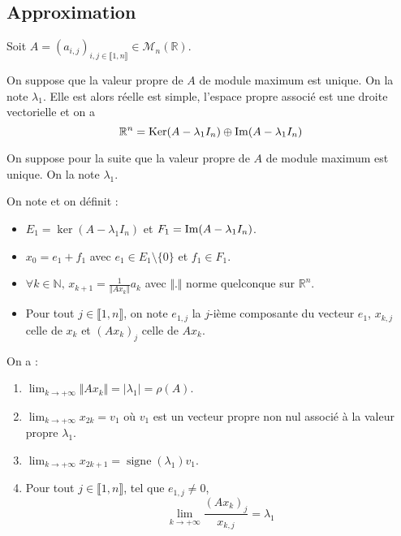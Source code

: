   \subsection{Approximation}

  Soit $A = (a_{i,j})_{i, j \in \llbracket 1, n \rrbracket} \in \mathcal{M}_n(\mathbb{R})$.


  \begin{theorem}
    On suppose que la valeur propre de $A$ de module maximum est unique. On la note $\lambda_1$. Elle est alors réelle est simple, l'espace propre associé est une droite vectorielle et on a
    \[ \mathbb{R}^n = \mathrm{Ker}(A-\lambda_1 I_n) \oplus \mathrm{Im}(A-\lambda_1 I_n) \]
  \end{theorem}

  On suppose pour la suite que la valeur propre de $A$ de module maximum est unique. On la note $\lambda_1$.

  \begin{notation}
    On note et on définit :
    \begin{itemize}
      \item $E_1 = \ker(A-\lambda_1 I_n)$ et $F_1 = \mathrm{Im}(A-\lambda_1 I_n)$.
      \item $x_0 = e_1 + f_1$ avec $e_1 \in E_1 \setminus \{ 0 \}$ et $f_1 \in F_1$.
      \item $\forall k \in \mathbb{N}, \, x_{k+1} = \frac{1}{\Vert A x_k \Vert} a_k$ avec $\Vert . \Vert$ norme quelconque sur $\mathbb{R}^n$.
      \item Pour tout $j \in \llbracket 1,n \rrbracket$, on note $e_{1,j}$ la $j$-ième composante du vecteur $e_1$, $x_{k,j}$ celle de $x_k$ et $(Ax_k)_j$ celle de $Ax_k$.
    \end{itemize}
  \end{notation}

  \begin{theorem}
    On a :
    \begin{enumerate}[label=(\roman*)]
      \item $\lim_{k \rightarrow +\infty} \Vert A x_k \Vert = \vert \lambda_1 \vert = \rho(A)$.
      \item $\lim_{k \rightarrow +\infty} x_{2k} = v_1$ où $v_1$ est un vecteur propre non nul associé à la valeur propre $\lambda_1$.
      \item $\lim_{k \rightarrow +\infty} x_{2k+1} = \operatorname{signe}(\lambda_1) v_1$.
      \item Pour tout $j \in \llbracket 1,n \rrbracket$, tel que $e_{1,j} \neq 0$,
      \[ \lim_{k \rightarrow +\infty} \frac{(A x_k)_j}{x_{k,j}} = \lambda_1 \]
    \end{enumerate}
  \end{theorem}

